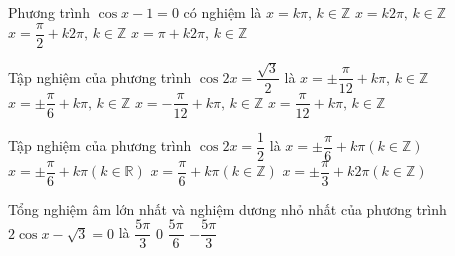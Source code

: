 \begin{ex}%
	Phương trình $\cos x-1=0$ có nghiệm là
	\choice
	{$x=k\pi, \, k\in \mathbb{Z}$}
	{\True $x=k2\pi, \, k\in \mathbb{Z}$}
	{$x=\dfrac{\pi}{2}+k2\pi, \, k\in \mathbb{Z}$}
	{$x=\pi +k2\pi, \, k\in \mathbb{Z}$}
\end{ex}
\begin{ex}%
	Tập nghiệm của phương trình $\cos 2x=\dfrac{\sqrt{3}}{2}$ là
	\choice
	{\True $x=\pm \dfrac{\pi}{12}+k\pi,\, k\in \mathbb{Z} $}
	{$x=\pm \dfrac{\pi}{6}+k\pi,\, k\in \mathbb{Z} $}
	{$x=-\dfrac{\pi}{12}+k\pi, \, k\in \mathbb{Z}$}
	{$x=\dfrac{\pi}{12}+k\pi, \, k\in \mathbb{Z}$}
\end{ex}
\begin{ex}%
	Tập nghiệm của phương trình $\cos 2x=\dfrac{1}{2}$ là
	\choice
	{\True $x=\pm \dfrac{\pi}{6}+k\pi \left(k\in \mathbb{Z}\right)$}
	{$x=\pm \dfrac{\pi}{6}+k\pi \left(k\in \mathbb{R}\right)$}
	{$x=\dfrac{\pi}{6}+k\pi \left(k\in \mathbb{Z}\right)$}
	{$x=\pm \dfrac{\pi}{3}+k2\pi \left(k\in \mathbb{Z}\right)$}
\end{ex}
\begin{ex}%
	Tổng nghiệm âm lớn nhất và nghiệm dương nhỏ nhất của phương trình $2\cos x-\sqrt{3}=0$ là
	\choice
	{$\dfrac{5\pi}{3}$}
	{\True $0$}
	{$\dfrac{5\pi}{6}$}
	{$-\dfrac{5\pi}{3}$}
\end{ex}
